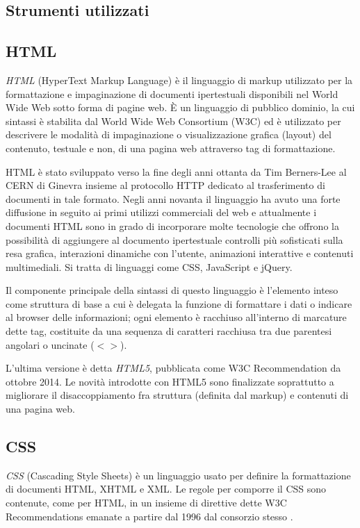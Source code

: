 \subsection{Strumenti utilizzati}
\label{subs:strumenti}

\subsection*{HTML}
\label{subs:html}
\emph{HTML} (HyperText Markup Language) è il linguaggio di markup utilizzato per la formattazione e impaginazione di documenti ipertestuali disponibili nel World Wide Web sotto forma di pagine web. È un linguaggio di pubblico dominio, la cui sintassi è stabilita dal World Wide Web Consortium (W3C) \cite{html} ed è utilizzato per descrivere le modalità di impaginazione o visualizzazione grafica (layout) del contenuto, testuale e non, di una pagina web attraverso tag di formattazione.

HTML è stato sviluppato verso la fine degli anni ottanta da Tim Berners-Lee al CERN di Ginevra insieme al protocollo HTTP dedicato al trasferimento di documenti in tale formato. Negli anni novanta il linguaggio ha avuto una forte diffusione in seguito ai primi utilizzi commerciali del web e attualmente i documenti HTML sono in grado di incorporare molte tecnologie che offrono la possibilità di aggiungere al documento ipertestuale controlli più sofisticati sulla resa grafica, interazioni dinamiche con l'utente, animazioni interattive e contenuti multimediali. Si tratta di linguaggi come CSS, JavaScript e jQuery.

Il componente principale della sintassi di questo linguaggio è l'elemento inteso come struttura di base a cui è delegata la funzione di formattare i dati o indicare al browser delle informazioni; ogni elemento è racchiuso all'interno di marcature dette tag, costituite da una sequenza di caratteri racchiusa tra due parentesi angolari o uncinate ($< >$).

L'ultima versione è detta \emph{HTML5}, pubblicata come W3C Recommendation da ottobre 2014. Le novità introdotte con HTML5 sono finalizzate soprattutto a migliorare il disaccoppiamento fra struttura (definita dal markup) e contenuti di una pagina web.

\subsection*{CSS}
\label{subs:css}
\emph{CSS} (Cascading Style Sheets) è un linguaggio usato per definire la formattazione di documenti HTML, XHTML e XML. Le regole per comporre il CSS sono contenute, come per HTML, in un insieme di direttive dette W3C Recommendations emanate a partire dal 1996 dal consorzio stesso \cite{css}.

